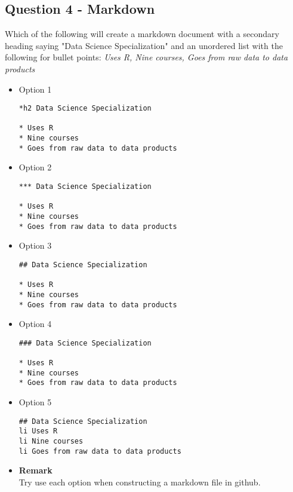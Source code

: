 \documentclass[12pt]{article}
\begin{document}
\subsection*{Question 4 - Markdown}
Which of the following will create a markdown document with a secondary heading saying "Data Science Specialization" and an unordered list with the following for bullet points: \textit{Uses R, Nine courses, Goes from raw data to data products}
\begin{itemize}
\item Option 1
\begin{framed}
\begin{verbatim}
*h2 Data Science Specialization 

* Uses R 
* Nine courses 
* Goes from raw data to data products
\end{verbatim}
\end{framed}
\item Option 2
\begin{framed}
\begin{verbatim}
*** Data Science Specialization 

* Uses R 
* Nine courses 
* Goes from raw data to data products
\end{verbatim}
\end{framed}
\item Option 3
\begin{framed}
\begin{verbatim}
## Data Science Specialization 

* Uses R 
* Nine courses 
* Goes from raw data to data products
\end{verbatim}
\end{framed}
\newpage
\item Option 4
\begin{framed}
\begin{verbatim}
### Data Science Specialization 

* Uses R 
* Nine courses 
* Goes from raw data to data products
\end{verbatim}
\end{framed}

\item Option 5
\begin{framed}
\begin{verbatim}
## Data Science Specialization 
li Uses R 
li Nine courses 
li Goes from raw data to data products
\end{verbatim}
\end{framed}

\item \textbf{Remark} \\
Try use each option when constructing a markdown file in github.
\end{itemize}
\end{document}
